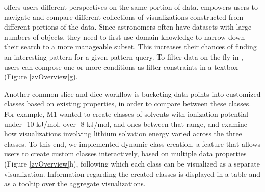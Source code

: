 offers users different perspectives on the same portion of data.
 empowers users to 
navigate and compare different collections 
of visualizations constructed 
from  different portions of the data. 
Since astronomers often have datasets 
with large numbers of objects, 
they need to first use domain knowledge 
to narrow down their search to a more manageable subset.
This increases their chances of finding an 
interesting pattern for a given pattern query. 
To filter data on-the-fly in \zvpp, 
users can compose one or more conditions 
as filter constraints in a textbox (Figure \ref{zvOverview}g). 
\par Another common slice-and-dice workflow is 
bucketing data points into customized classes 
based on existing properties, in order to compare between these classes. 
For example, M1 wanted to create classes of solvents with ionization potential under -10 kJ/mol, over -8 kJ/mol, and ones between that range, and 
examine how visualizations involving lithium solvation energy 
varied across the three classes. 
To this end, we implemented dynamic class creation, 
a feature that allows users to create custom classes interactively, 
based on multiple data properties (Figure \ref{zvOverview}h),
following which each class can be visualized as a separate visualization. 
Information regarding the created classes is displayed in a table and as a tooltip over the aggregate visualizations.
%

